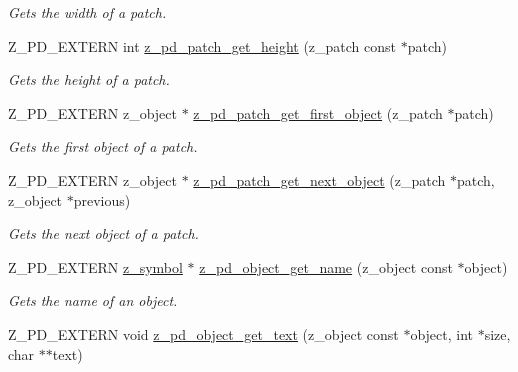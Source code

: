 \begin{DoxyCompactItemize}
\begin{DoxyCompactList}\small\item\em Gets the width of a patch. \end{DoxyCompactList}\item 
\hypertarget{group__zpd_ga5171e23c7f3ff1ea80e3b77d0d43fa8a}{Z\-\_\-\-P\-D\-\_\-\-E\-X\-T\-E\-R\-N int \hyperlink{group__zpd_ga5171e23c7f3ff1ea80e3b77d0d43fa8a}{z\-\_\-pd\-\_\-patch\-\_\-get\-\_\-height} (z\-\_\-patch const $\ast$patch)}\label{group__zpd_ga5171e23c7f3ff1ea80e3b77d0d43fa8a}

\begin{DoxyCompactList}\small\item\em Gets the height of a patch. \end{DoxyCompactList}\item 
\hypertarget{group__zpd_ga65e79f1be56a446c435ad80ee35fcd13}{Z\-\_\-\-P\-D\-\_\-\-E\-X\-T\-E\-R\-N z\-\_\-object $\ast$ \hyperlink{group__zpd_ga65e79f1be56a446c435ad80ee35fcd13}{z\-\_\-pd\-\_\-patch\-\_\-get\-\_\-first\-\_\-object} (z\-\_\-patch $\ast$patch)}\label{group__zpd_ga65e79f1be56a446c435ad80ee35fcd13}

\begin{DoxyCompactList}\small\item\em Gets the first object of a patch. \end{DoxyCompactList}\item 
\hypertarget{group__zpd_gad136425206acc333721a2cd08b9cbcbf}{Z\-\_\-\-P\-D\-\_\-\-E\-X\-T\-E\-R\-N z\-\_\-object $\ast$ \hyperlink{group__zpd_gad136425206acc333721a2cd08b9cbcbf}{z\-\_\-pd\-\_\-patch\-\_\-get\-\_\-next\-\_\-object} (z\-\_\-patch $\ast$patch, z\-\_\-object $\ast$previous)}\label{group__zpd_gad136425206acc333721a2cd08b9cbcbf}

\begin{DoxyCompactList}\small\item\em Gets the next object of a patch. \end{DoxyCompactList}\item 
\hypertarget{group__zpd_ga02c120835c7503529a633e0f4cdbb948}{Z\-\_\-\-P\-D\-\_\-\-E\-X\-T\-E\-R\-N \hyperlink{group__zpd_ga43e609e9bccc7a2018b8f16558b9494c}{z\-\_\-symbol} $\ast$ \hyperlink{group__zpd_ga02c120835c7503529a633e0f4cdbb948}{z\-\_\-pd\-\_\-object\-\_\-get\-\_\-name} (z\-\_\-object const $\ast$object)}\label{group__zpd_ga02c120835c7503529a633e0f4cdbb948}

\begin{DoxyCompactList}\small\item\em Gets the name of an object. \end{DoxyCompactList}\item 
\hypertarget{group__zpd_gad49911396e6fad2a6f1dc1b316b47603}{Z\-\_\-\-P\-D\-\_\-\-E\-X\-T\-E\-R\-N void \hyperlink{group__zpd_gad49911396e6fad2a6f1dc1b316b47603}{z\-\_\-pd\-\_\-object\-\_\-get\-\_\-text} (z\-\_\-object const $\ast$object, int $\ast$size, char $\ast$$\ast$text)}\label{group__zpd_gad49911396e6fad2a6f1dc1b316b47603}


\end{DoxyCompactItemize}
